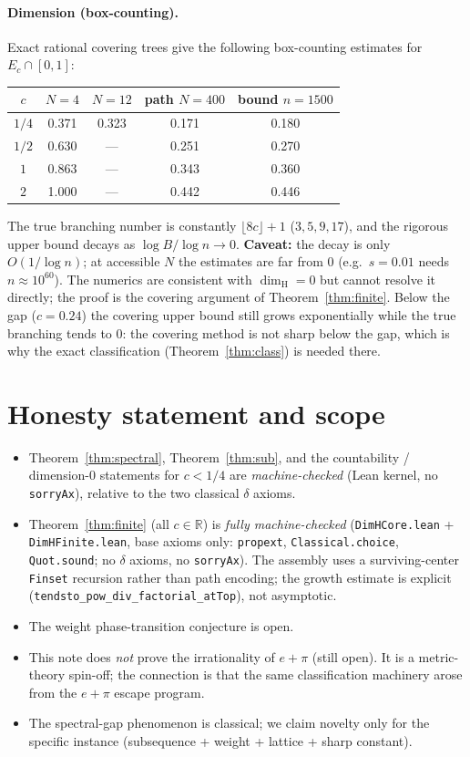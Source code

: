 \documentclass[11pt]{article}
\theoremstyle{definition}
\theoremstyle{remark}
\newcommand{\R}{\mathbb{R}}
\newcommand{\dimH}{\dim_{\mathrm{H}}}
\begin{document}
\paragraph{Dimension (box-counting).} Exact rational covering trees give the
following box-counting estimates for $E_c\cap[0,1]$:
\begin{center}
\begin{tabular}{c|cccc}
$c$ & $N=4$ & $N=12$ & path $N=400$ & bound $n=1500$\\\hline
$1/4$ & 0.371 & 0.323 & 0.171 & 0.180\\
$1/2$ & 0.630 & --- & 0.251 & 0.270\\
$1$   & 0.863 & --- & 0.343 & 0.360\\
$2$   & 1.000 & --- & 0.442 & 0.446
\end{tabular}
\end{center}
The true branching number is constantly $\lfloor8c\rfloor+1$ ($3,5,9,17$), and
the rigorous upper bound decays as $\log B/\log n\to0$. \textbf{Caveat:} the
decay is only $O(1/\log n)$; at accessible $N$ the estimates are far from $0$
(e.g.\ $s=0.01$ needs $n\approx10^{60}$). The numerics are consistent with
$\dimH=0$ but cannot resolve it directly; the proof is the covering argument of
Theorem~\ref{thm:finite}. Below the gap ($c=0.24$) the covering upper bound
still grows exponentially while the true branching tends to $0$: the covering
method is not sharp below the gap, which is why the exact classification
(Theorem~\ref{thm:class}) is needed there.

\section{Honesty statement and scope}

\begin{itemize}[leftmargin=1.5em]
\item Theorem~\ref{thm:spectral}, Theorem~\ref{thm:sub}, and the countability /
dimension-$0$ statements for $c<1/4$ are \emph{machine-checked} (Lean kernel,
no \texttt{sorryAx}), relative to the two classical $\delta$ axioms.
\item Theorem~\ref{thm:finite} (all $c\in\R$) is \emph{fully machine-checked}
(\texttt{DimHCore.lean} + \texttt{DimHFinite.lean}, base axioms only:
\texttt{propext}, \texttt{Classical.choice}, \texttt{Quot.sound}; no
$\delta$ axioms, no \texttt{sorryAx}). The assembly uses a surviving-center
\texttt{Finset} recursion rather than path encoding; the growth estimate is
explicit (\texttt{tendsto\_pow\_div\_factorial\_atTop}), not asymptotic.
\item The weight phase-transition conjecture is open.
\item This note does \emph{not} prove the irrationality of $e+\pi$ (still open).
It is a metric-theory spin-off; the connection is that the same classification
machinery arose from the $e+\pi$ escape program.
\item The spectral-gap phenomenon is classical; we claim novelty only for the
specific instance (subsequence + weight + lattice + sharp constant).
\end{itemize}
\end{document}
